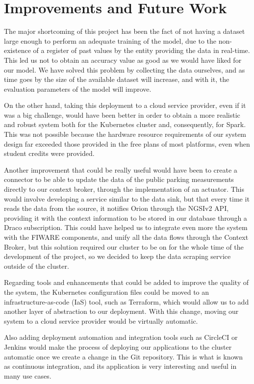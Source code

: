 \chapter{Improvements and Future Work}
\label{chapter:Improvements}

The major shortcoming of this project has been the fact of not having a dataset large enough to perform an adequate training of the model, due to the non-existence of a register of past values by the entity providing the data in real-time. This led us not to obtain an accuracy value as good as we would have liked for our model. We have solved this problem by collecting the data ourselves, and as time goes by the size of the available dataset will increase, and with it, the evaluation parameters of the model will improve.

On the other hand, taking this deployment to a cloud service provider, even if it was a big challenge, would have been better in order to obtain a more realistic and robust system both for the Kubernetes cluster and, consequently, for Spark. This was not possible because the hardware resource requirements of our system design far exceeded those provided in the free plans of most platforms, even when student credits were provided.

Another improvement that could be really useful would have been to create a connector to be able to update the data of the public parking measurements directly to our context broker, through the implementation of an actuator. This would involve developing a service similar to the data sink, but that every time it reads the data from the source, it notifies Orion through the NGSIv2 API, providing it with the context information to be stored in our database through a Draco subscription. This could have helped us to integrate even more the system with the FIWARE components, and unify all the data flows through the Context Broker, but this solution required our cluster to be on for the whole time of the development of the project, so we decided to keep the data scraping service outside of the cluster.

Regarding tools and enhancements that could be added to improve the quality of the system, the Kubernetes configuration files could be moved to an infrastructure-as-code (IaS) tool, such as Terraform, which would allow us to add another layer of abstraction to our deployment. With this change, moving our system to a cloud service provider would be virtually automatic.

Also adding deployment automation and integration tools such as CircleCI or Jenkins would make the process of deploying our applications to the cluster automatic once we create a change in the Git repository. This is what is known as continuous integration, and its application is very interesting and useful in many use cases. 